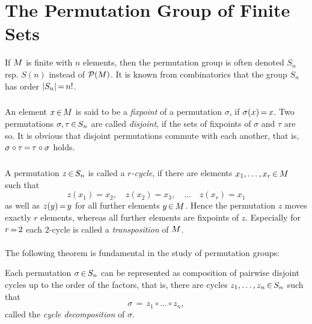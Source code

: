 \documentclass[11pt,twoside]{article}
\begin{document}
\section{The Permutation Group of Finite Sets}
If $M$ is finite with $n$ elements,
then the permutation group is often denoted $S_n$ rsp. $S(n)$
instead of ${\mathcal{P}}(M)$.
It is known from combinatorics
that the group $S_n$ has order $\abs{S_n} \eq n!$.

\subparagraph{}
An element $x {\,\in\,} M$ is said to be a \textit{fixpoint}
of a permutation $\sigma$,
if $\sigma(x) {\,=\,} x$.
Two permutations $\sigma, \tau {\,\in\,} S_n$ are called \textit{disjoint},
if the sets of fixpoints of $\sigma$ and $\tau$ are so.
It is obvious
that disjoint permutations commute with each another,
that is,
$\sigma \circ \tau {\,=\,} \tau \circ \sigma$ holds.

\subparagraph{}
A permutation $z {\,\in\,} S_n$ is called a \textit{$r$-cycle},
if there are elements $x_1,\ldots,x_r {\,\in\,} M$ such that
\[
z(x_1) = x_2,
\quad
z(x_2) = x_3,
\quad
\ldots
\quad
z(x_r) = x_1
\]
as well as $z(y) {\,=\,} y$ for all further elements $y {\,\in\,} M$.
Hence the permutation $z$ moves exactly $r$ elements,
whereas all further elements are fixpoints of $z$.
Especially for $r {\,=\,} 2$ each $2$-cycle
is called a \textit{transposition} of $M$.

\paragraph{}
The following theorem is fundamental in the study of permutation groups:

\begin{theorem}
Each permutation $\sigma {\,\in\,} S_n$
can be represented as composition of pairwise disjoint cycles
up to the order of the factors,
that is,
there are cycles $z_1,\ldots,z_n {\,\in\,} S_n$ such that
\[
\sigma \, = \, z_1 \circ \ldots \circ z_n,
\]
called the \textit{cycle decomposition} of $\sigma$.
\end{theorem}
\end{document}
